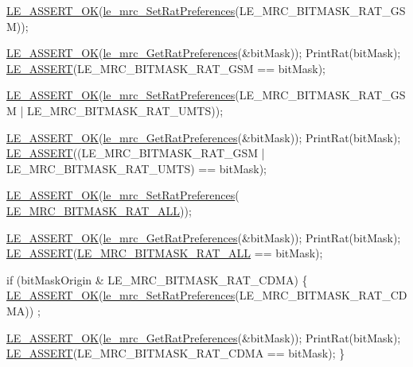 \begin{DoxyCodeInclude}
{    \hyperlink{le__log_8h_a7cd2daa3d4af1de4d29e0eed95187484}{LE\_ASSERT\_OK}(\hyperlink{le__mrc__interface_8h_a2d4abd391bc69c218538f5d8e1be4e01}{le\_mrc\_SetRatPreferences}(LE\_MRC\_BITMASK\_RAT\_GSM));

    \hyperlink{le__log_8h_a7cd2daa3d4af1de4d29e0eed95187484}{LE\_ASSERT\_OK}(\hyperlink{le__mrc__interface_8h_ae9fa8655738c63e392c8dcc862bdb1d5}{le\_mrc\_GetRatPreferences}(&bitMask));
    PrintRat(bitMask);
    \hyperlink{le__log_8h_ac0dbbef91dc0fed449d0092ff0557b39}{LE\_ASSERT}(LE\_MRC\_BITMASK\_RAT\_GSM == bitMask);

    \hyperlink{le__log_8h_a7cd2daa3d4af1de4d29e0eed95187484}{LE\_ASSERT\_OK}(\hyperlink{le__mrc__interface_8h_a2d4abd391bc69c218538f5d8e1be4e01}{le\_mrc\_SetRatPreferences}(LE\_MRC\_BITMASK\_RAT\_GSM | 
      LE\_MRC\_BITMASK\_RAT\_UMTS));

    \hyperlink{le__log_8h_a7cd2daa3d4af1de4d29e0eed95187484}{LE\_ASSERT\_OK}(\hyperlink{le__mrc__interface_8h_ae9fa8655738c63e392c8dcc862bdb1d5}{le\_mrc\_GetRatPreferences}(&bitMask));
    PrintRat(bitMask);
    \hyperlink{le__log_8h_ac0dbbef91dc0fed449d0092ff0557b39}{LE\_ASSERT}((LE\_MRC\_BITMASK\_RAT\_GSM | LE\_MRC\_BITMASK\_RAT\_UMTS) == bitMask);

    \hyperlink{le__log_8h_a7cd2daa3d4af1de4d29e0eed95187484}{LE\_ASSERT\_OK}(\hyperlink{le__mrc__interface_8h_a2d4abd391bc69c218538f5d8e1be4e01}{le\_mrc\_SetRatPreferences}(
      \hyperlink{le__mrc__interface_8h_af643c7005da7f2466302eebdf7a29d93aa6e87ad274b7f5011413ea0e8375300b}{LE\_MRC\_BITMASK\_RAT\_ALL}));

    \hyperlink{le__log_8h_a7cd2daa3d4af1de4d29e0eed95187484}{LE\_ASSERT\_OK}(\hyperlink{le__mrc__interface_8h_ae9fa8655738c63e392c8dcc862bdb1d5}{le\_mrc\_GetRatPreferences}(&bitMask));
    PrintRat(bitMask);
    \hyperlink{le__log_8h_ac0dbbef91dc0fed449d0092ff0557b39}{LE\_ASSERT}(\hyperlink{le__mrc__interface_8h_af643c7005da7f2466302eebdf7a29d93aa6e87ad274b7f5011413ea0e8375300b}{LE\_MRC\_BITMASK\_RAT\_ALL} == bitMask);

    \textcolor{keywordflow}{if} (bitMaskOrigin & LE\_MRC\_BITMASK\_RAT\_CDMA)
    \{
        \hyperlink{le__log_8h_a7cd2daa3d4af1de4d29e0eed95187484}{LE\_ASSERT\_OK}(\hyperlink{le__mrc__interface_8h_a2d4abd391bc69c218538f5d8e1be4e01}{le\_mrc\_SetRatPreferences}(LE\_MRC\_BITMASK\_RAT\_CDMA))
      ;

        \hyperlink{le__log_8h_a7cd2daa3d4af1de4d29e0eed95187484}{LE\_ASSERT\_OK}(\hyperlink{le__mrc__interface_8h_ae9fa8655738c63e392c8dcc862bdb1d5}{le\_mrc\_GetRatPreferences}(&bitMask));
        PrintRat(bitMask);
        \hyperlink{le__log_8h_ac0dbbef91dc0fed449d0092ff0557b39}{LE\_ASSERT}(LE\_MRC\_BITMASK\_RAT\_CDMA == bitMask);
    \}

}
\end{DoxyCodeInclude}
